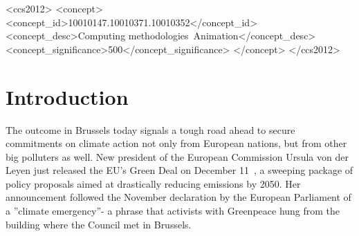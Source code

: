 \def\documentclass[sigconf]{acmart}
\begin{document}
\begin{CCSXML}
<ccs2012>
   <concept>
       <concept_id>10010147.10010371.10010352</concept_id>
       <concept_desc>Computing methodologies~Animation</concept_desc>
       <concept_significance>500</concept_significance>
       </concept>
 </ccs2012>
\end{CCSXML}





\begin{abstract}
Please note that TAPS will generate the title and author information for the generated PDF and HTML versions of this document from the information provided by the contact author on the completed rights form, instead of the title and author information provided by the author in the source materials. You still need to include that information if (a) you are preparing your source material in LaTeX and (b) you wish to use the ``authornote'' and ``authornotemark'' commands, as shown in this example.

Duis cursus placerat leo ac vehicula. Donec id dolor vel nunc maximus consectetur. Morbi pharetra, odio quis mattis gravida, orci dolor fermentum arcu, id tempus ante ante ut justo. Pellentesque fringilla orci a quam lacinia, non mollis orci blandit. Aliquam erat volutpat. Duis sit amet magna commodo, faucibus risus sed, dictum tortor. Cras porttitor facilisis libero non rutrum. Nullam dignissim velit a quam finibus, sed consectetur arcu mattis.
\end{abstract}


\maketitle

\section{Introduction}
The outcome in Brussels today signals a tough road ahead to secure commitments on climate action not only from European nations, but from other big polluters as well. New president of the European Commission Ursula von der Leyen just released the EU’s Green Deal on December 11~\cite{Hagerup1993}, a sweeping package of policy proposals aimed at drastically reducing emissions by 2050. Her announcement followed the November declaration by the European Parliament of a ''climate emergency''- a phrase that activists with Greenpeace hung from the building where the Council met in Brussels.
\end{document}

